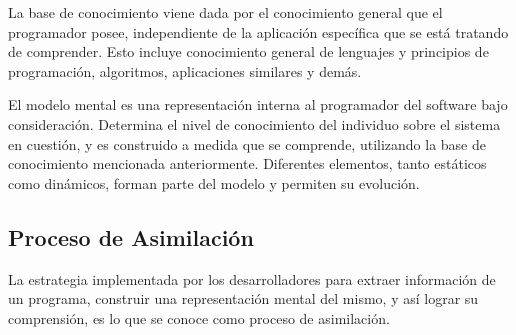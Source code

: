 La base de conocimiento viene dada por el conocimiento general que el programador posee,
independiente de la aplicación específica que se está tratando de comprender.
Esto incluye conocimiento general de lenguajes y principios de programación, algoritmos, 
aplicaciones similares y demás.

El modelo mental es una representación interna al programador del software bajo consideración.
Determina el nivel de conocimiento del individuo sobre el sistema en cuestión, y es construido
a medida que se comprende, utilizando la base de conocimiento mencionada anteriormente.
Diferentes elementos, tanto estáticos como dinámicos, forman parte del modelo y permiten
su evolución.\cite{MayrhauserVans95}

\subsection{Proceso de Asimilación}
La estrategia implementada por los desarrolladores para extraer información de un programa, 
construir una representación mental del mismo, y así lograr su comprensión, es lo que se
conoce como proceso de asimilación.

